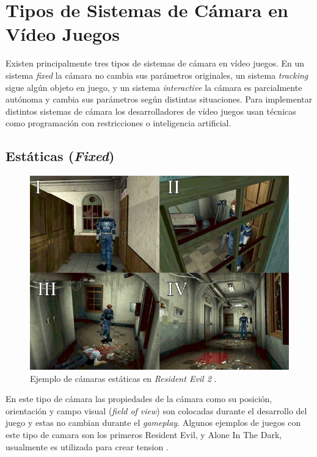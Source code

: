 \section{Tipos de Sistemas de Cámara en Vídeo Juegos}
Existen principalmente tres tipos de sistemas de cámara en vídeo juegos. En un sistema \emph{fixed} la cámara no cambia sus parámetros originales, un sistema \emph{tracking} sigue algún objeto en juego, y un sistema \emph{interactive} la cámara es parcialmente autónoma y cambia sus parámetros según distintas situaciones. Para implementar distintos sistemas de cámara los desarrolladores de vídeo juegos usan técnicas como programación con restricciones o inteligencia artificial. 
\subsection{Estáticas (\emph{Fixed})}
\begin{figure}
\includegraphics[width=\linewidth]{media/resident_evil_camerawork.jpg} 
\caption{Ejemplo de cámaras estáticas en \emph{Resident Evil 2} \cite{fixed_camera} \cite{residentevil2}.}
\end{figure}
En este tipo de cámara las propiedades de la cámara como su posición, orientación y campo visual (\emph{field of view}) son colocadas durante el desarrollo del juego y estas no cambian durante el \emph{gameplay}. Algunos ejemplos de juegos con este tipo de camara son los primeros Resident Evil, y Alone In The Dark, usualmente es utilizada para crear tension \cite{res5_review}\cite{fixed_camera}.
